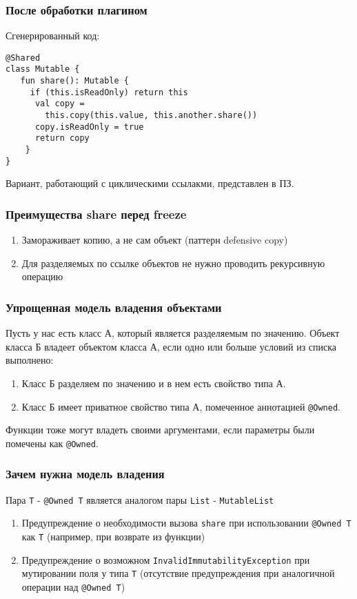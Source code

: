 \documentclass[14pt,xcolor={dvipsnames}]{beamer}
\begin{document}
\begin{frame}[fragile]
\frametitle{После обработки плагином}
Сгенерированный код:
\begin{lstlisting}[basicstyle=\fontsize{10}{1}\selectfont\ttfamily]
@Shared
class Mutable {
   fun share(): Mutable {
     if (this.isReadOnly) return this
	  val copy = 
	    this.copy(this.value, this.another.share())
	  copy.isReadOnly = true
	  return copy
	}
}
\end{lstlisting}
\footnotesize{Вариант, работающий с циклическими ссылакми, представлен в ПЗ.}
\end{frame}


\begin{frame}
\frametitle{Преимущества share перед freeze}
\begin{enumerate}
	\item Замораживает копию, а не сам объект (паттерн defensive copy)
	\item Для разделяемых по ссылке объектов не нужно проводить рекурсивную операцию
\end{enumerate}	
\end{frame}

\begin{frame}
\frametitle{Упрощенная модель владения объектами}
Пусть у нас есть класс А, который является разделяемым по значению.
Объект класса Б владеет объектом класса А, если одно или больше условий из списка выполнено:

\begin{enumerate}
	\item Класс Б разделяем по значению и в нем есть свойство типа А.
	\item Класс Б имеет приватное свойство типа А, помеченное аннотацией \texttt{@Owned}.
\end{enumerate}

Функции тоже могут владеть своими аргументами, если параметры были помечены как  \texttt{@Owned}.
\end{frame}

\begin{frame}
\frametitle{Зачем нужна модель владения}
Пара \texttt{T} - \texttt{@Owned T} является аналогом пары \texttt{List} - \texttt{MutableList}

\begin{enumerate}
	\item Предупреждение о необходимости вызова \texttt{share} при использовании \texttt{@Owned T} как \texttt{T} (например, при возврате из функции)
	\item Предупреждение о возможном \texttt{InvalidImmutabilityException} при мутировании поля у типа \texttt{T} (отсутствие предупреждения при аналогичной операции над \texttt{@Owned T})
\end{enumerate}
\end{frame}
\end{document}
